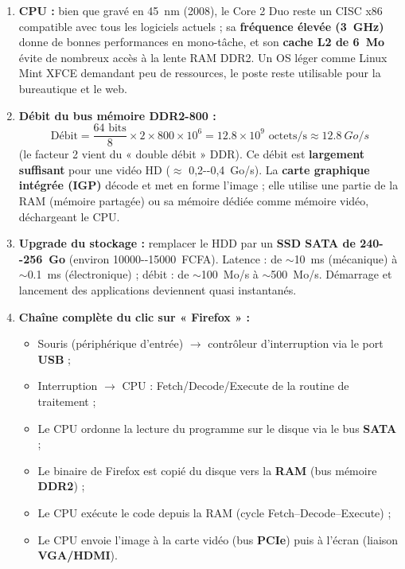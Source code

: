 \documentclass[11pt]{article}
\begin{document}
\begin{corrige}
\begin{enumerate}
    \item \textbf{CPU :} bien que gravé en \SI{45}{nm} (2008), le Core 2 Duo reste un CISC x86 compatible avec tous les logiciels actuels ; sa \textbf{fréquence élevée (\SI{3}{GHz})} donne de bonnes performances en mono-tâche, et son \textbf{cache L2 de \SI{6}{Mo}} évite de nombreux accès à la lente RAM DDR2. Un OS léger comme Linux Mint XFCE demandant peu de ressources, le poste reste utilisable pour la bureautique et le web.
    \item \textbf{Débit du bus mémoire DDR2-800 :}
    \[ \text{Débit} = \frac{64 \text{ bits}}{8} \times 2 \times 800 \times 10^{6} = \num{12,8} \times 10^{9} \text{ octets/s} \approx \SI{12,8}{Go/s} \]
    (le facteur 2 vient du « double débit » DDR). Ce débit est \textbf{largement suffisant} pour une vidéo HD ($\approx$ \SI{0,2--0,4}{Go/s}). La \textbf{carte graphique intégrée (IGP)} décode et met en forme l'image ; elle utilise une partie de la RAM (mémoire partagée) ou sa mémoire dédiée comme mémoire vidéo, déchargeant le CPU.
    \item \textbf{Upgrade du stockage :} remplacer le HDD par un \textbf{SSD SATA de \SI{240--256}{Go}} (environ \SI{10000--15000}{FCFA}). Latence : de $\sim$\SI{10}{ms} (mécanique) à $\sim$\SI{0,1}{ms} (électronique) ; débit : de $\sim$\SI{100}{Mo/s} à $\sim$\SI{500}{Mo/s}. Démarrage et lancement des applications deviennent quasi instantanés.
    \item \textbf{Chaîne complète du clic sur « Firefox » :}
    \begin{itemize}
        \item Souris (périphérique d'entrée) $\to$ contrôleur d'interruption via le port \textbf{USB} ;
        \item Interruption $\to$ CPU : Fetch/Decode/Execute de la routine de traitement ;
        \item Le CPU ordonne la lecture du programme sur le disque via le bus \textbf{SATA} ;
        \item Le binaire de Firefox est copié du disque vers la \textbf{RAM} (bus mémoire \textbf{DDR2}) ;
        \item Le CPU exécute le code depuis la RAM (cycle Fetch--Decode--Execute) ;
        \item Le CPU envoie l'image à la carte vidéo (bus \textbf{PCIe}) puis à l'écran (liaison \textbf{VGA/HDMI}).
    \end{itemize}

\end{enumerate}
\end{corrige}
\end{document}
